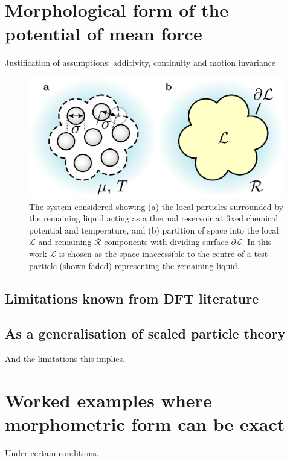 \documentclass[12pt]{report}
\begin{document}

\section{Morphological form of the potential of mean force}
Justification of assumptions: additivity, continuity and motion invariance

\begin{figure}
  \includegraphics[width=\linewidth]{droplet-morph}
  \caption{
    The system considered showing
    (a) the local particles surrounded by the remaining liquid acting as a thermal reservoir at fixed chemical potential and temperature, and
    (b) partition of space into the local $\mathcal{L}$ and remaining $\mathcal{R}$ components with dividing surface $\partial\mathcal{L}$.
    In this work $\mathcal{L}$ is chosen as the space inaccessible to the centre of a test particle (shown faded) representing the remaining liquid.
  }
\end{figure}

\subsection{Limitations known from DFT literature}
\subsection{As a generalisation of scaled particle theory}
And the limitations this implies.

\section{Worked examples where morphometric form can be exact}
Under certain conditions.
\end{document}
